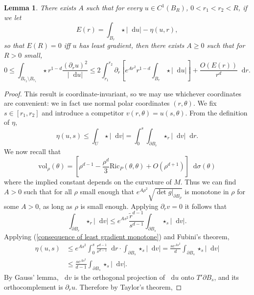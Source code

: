 \documentclass[reqno,11pt]{amsart}
\newcommand{\Ric}{\mathrm{Ric}}
\newcommand*\dif{\mathop{}\!\mathrm{d}}
\newcommand{\vol}{\mathrm{vol}}
\newtheorem{lemma}[theorem]{Lemma}
\theoremstyle{definition}
\numberwithin{equation}{section}
\begin{document}
\begin{lemma}\label{monotonicity lemma}
There exists $A$ such that for every $u \in C^1(B_R)$, $0 < r_1 < r_2 < R$, if we let
$$E(r) = \int_{B_r} \star |\dif u| - \eta(u, r),$$
so that $E(R) = 0$ iff $u$ has least gradient, then there exists $A \geq 0$ such that for $R > 0$ small,
\begin{equation}\label{monotonicity lemma eqn}
0 \leq \int_{B_{r_2} \setminus B_{r_1}} \star r^{1 - d}\frac{(\partial_ru)^2}{|\dif u|} \leq 2\int_{r_1}^{r_2} \partial_r \left[e^{Ar^2} r^{1-d}\int_{B_r} \star |\dif u|\right] + \frac{O(E(r))}{r^d} \dif r.
\end{equation}
\end{lemma}
\begin{proof}
This result is coordinate-invariant, so we may use whichever coordinates are convenient: we in fact use normal polar coordinates $(r, \theta)$.
We fix $s \in [r_1, r_2]$ and introduce a competitor $v(r, \theta) = u(s, \theta)$.
From the definition of $\eta$,
\begin{equation}\label{consequence of least gradient monotone}
    \eta(u, s) \leq \int_U \star |\dif v| = \int_0^s \int_{\partial B_r} \star_r |\dif v| \dif r.
\end{equation}
We now recall that
$$\vol_\rho(\theta) = \left[\rho^{d - 1} - \frac{\rho^d}{3} \Ric_P(\theta, \theta) + O(\rho^{d + 1})\right] \dif \sigma(\theta)$$
where the implied constant depends on the curvature of $M$.
Thus we can find $A > 0$ such that for all $\rho$ small enough that $e^{A\rho^2} \sqrt{\det g|_{\partial B_\rho}}$ is monotone in $\rho$ for some $A > 0$, as long as $\rho$ is small enough.
Applying $\partial_r v = 0$ it follows that
\begin{equation}\label{introduce the ricci tensor}
\int_{\partial B_r} \star_r |\dif v| \leq e^{As^2} \frac{\tilde r^{d - 1}}{s^{d - 1}} \int_{\partial B_s} \star_s |\dif v|.
\end{equation}
Applying (\ref{consequence of least gradient monotone}) and Fubini's theorem,
\begin{align*}
\eta(u, s) &\leq e^{As^2} \int_0^s \frac{r^{d - 1}}{s^{d - 1}} \dif r \cdot \int_{\partial B_s} \star_s |\dif v| = \frac{s e^{As^2}}{d} \int_{\partial B_s} \star_s |\dif v|\\
&\leq \frac{s e^{As^2}}{d - 1} \int_{\partial B_s} \star_s |\dif v|.
\end{align*}
By Gauss' lemma, $\dif v$ is the orthogonal projection of $\dif u$ onto $T' \partial B_s$, and its orthocomplement is $\partial_r u$. Therefore by Taylor's theorem,

\end{proof}
\end{document}
